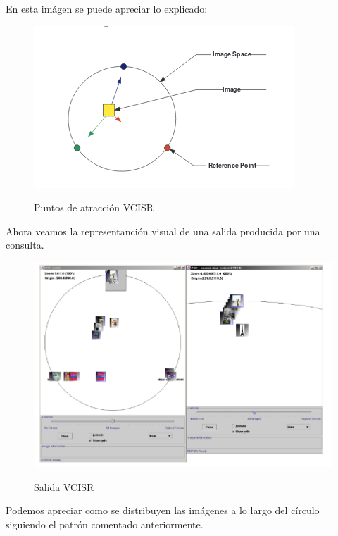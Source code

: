 En esta imágen se puede apreciar lo explicado:\\

\begin{figure}[H] %
\centering
\includegraphics[scale=0.7]{imagenes/VCISR.png}  %
\label{VCISR}
\caption{Puntos de atracción VCISR}
\end{figure}

Ahora veamos la representanción visual de una salida producida por una consulta.\\

\begin{figure}[H] %
\centering
\includegraphics[scale=0.7]{imagenes/VCISR2.png}  %
\label{VCISR}
\caption{Salida VCISR}
\end{figure}

Podemos apreciar como se distribuyen las imágenes a lo largo del círculo siguiendo el patrón comentado anteriormente.\\

